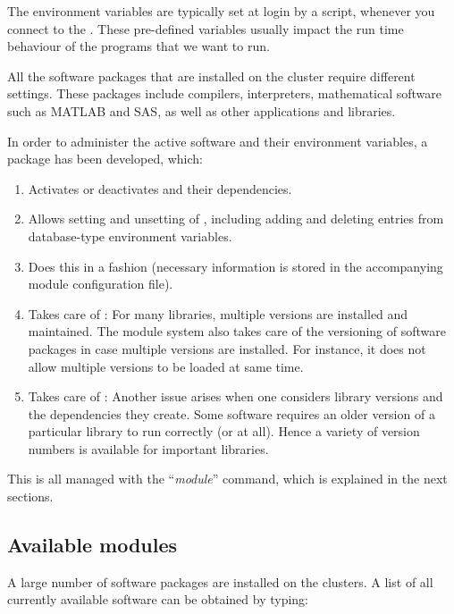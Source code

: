 The environment variables are typically set at login by a script, whenever you
connect to the \hpc. These pre-defined variables usually impact the run time
behaviour of the programs that we want to run.

All the software packages that are installed on the \hpc cluster require
different settings. These packages include compilers, interpreters,
mathematical software such as MATLAB and SAS, as well as other applications and
libraries.

In order to administer the active software and their environment variables, a
 package has been developed, which:

\begin{enumerate}
\item  Activates or deactivates  and their dependencies.
\item  Allows setting and unsetting of , including adding and deleting entries from database-type environment variables.
\item  Does this in a  fashion (necessary information is stored in the accompanying module configuration file).
\item  Takes care of : For many libraries, multiple versions are installed and maintained. The module system also takes care of the versioning of software packages in case multiple versions are installed. For instance, it does not allow multiple versions to be loaded at same time.
\item  Takes care of : Another issue arises when one considers library versions and the dependencies they create. Some software requires an older version of a particular library to run correctly (or at all). Hence a variety of version numbers is available for important libraries.
\end{enumerate}

This is all managed with the ``\emph{module}'' command, which is explained in the next sections.

\subsection{Available modules}

A large number of software packages are installed on the \hpc clusters. A
list of all currently available software can be obtained by typing:

\begin{prompt}
\end{prompt}

